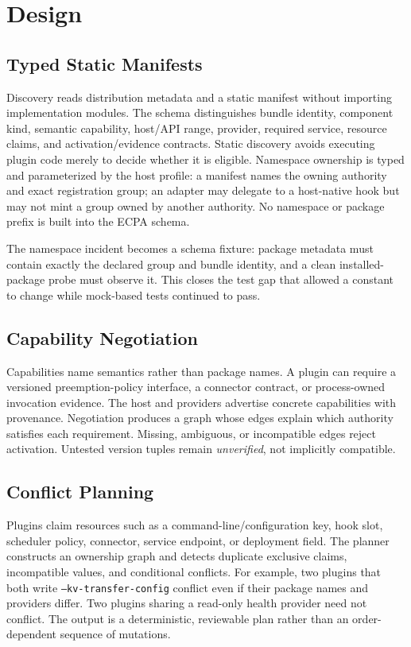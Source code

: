 \documentclass[letterpaper,twocolumn,10pt]{article}
\newcommand{\code}[1]{\texttt{#1}}
\begin{document}
\section{Design}
\subsection{Typed Static Manifests}
Discovery reads distribution metadata and a static manifest without importing
implementation modules.  The schema distinguishes bundle identity, component
kind, semantic capability, host/API range, provider, required service, resource
claims, and activation/evidence contracts.  Static discovery avoids executing
plugin code merely to decide whether it is eligible.  Namespace ownership is
typed and parameterized by the host profile: a manifest names the owning
authority and exact registration group; an adapter may delegate to a
host-native hook but may not mint a group owned by another authority.  No
namespace or package prefix is built into the ECPA schema.

The namespace incident becomes a schema fixture: package metadata must contain
exactly the declared group and bundle identity, and a clean installed-package
probe must observe it.  This closes the test gap that allowed a constant to
change while mock-based tests continued to pass.

\subsection{Capability Negotiation}
Capabilities name semantics rather than package names.  A plugin can require a
versioned preemption-policy interface, a connector contract, or process-owned
invocation evidence.  The host and providers advertise concrete capabilities
with provenance.  Negotiation produces a graph whose edges explain which
authority satisfies each requirement.  Missing, ambiguous, or incompatible
edges reject activation.  Untested version tuples remain \emph{unverified}, not
implicitly compatible.

\subsection{Conflict Planning}
Plugins claim resources such as a command-line/configuration key, hook slot,
scheduler policy, connector, service endpoint, or deployment field.  The
planner constructs an ownership graph and detects duplicate exclusive claims,
incompatible values, and conditional conflicts.  For example, two plugins that
both write \code{--kv-transfer-config} conflict even if their package names and
providers differ.  Two plugins sharing a read-only health provider need not
conflict.  The output is a deterministic, reviewable plan rather than an
order-dependent sequence of mutations.
\end{document}
